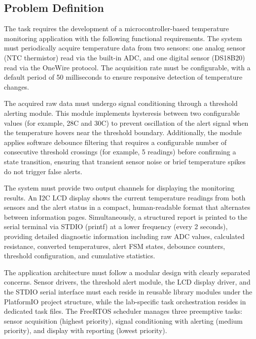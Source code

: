 \subsection{Problem Definition}

The task requires the development of a microcontroller-based temperature monitoring application with the following functional requirements. The system must periodically acquire temperature data from two sensors: one analog sensor (NTC thermistor) read via the built-in ADC, and one digital sensor (DS18B20) read via the OneWire protocol. The acquisition rate must be configurable, with a default period of 50 milliseconds to ensure responsive detection of temperature changes.

The acquired raw data must undergo signal conditioning through a threshold alerting module. This module implements hysteresis between two configurable values (for example, 28\textdegree C and 30\textdegree C) to prevent oscillation of the alert signal when the temperature hovers near the threshold boundary. Additionally, the module applies software debounce filtering that requires a configurable number of consecutive threshold crossings (for example, 5 readings) before confirming a state transition, ensuring that transient sensor noise or brief temperature spikes do not trigger false alerts.

The system must provide two output channels for displaying the monitoring results. An I2C LCD display shows the current temperature readings from both sensors and the alert status in a compact, human-readable format that alternates between information pages. Simultaneously, a structured report is printed to the serial terminal via STDIO (printf) at a lower frequency (every 2 seconds), providing detailed diagnostic information including raw ADC values, calculated resistance, converted temperatures, alert FSM states, debounce counters, threshold configuration, and cumulative statistics.

The application architecture must follow a modular design with clearly separated concerns. Sensor drivers, the threshold alert module, the LCD display driver, and the STDIO serial interface must each reside in reusable library modules under the PlatformIO project structure, while the lab-specific task orchestration resides in dedicated task files. The FreeRTOS scheduler manages three preemptive tasks: sensor acquisition (highest priority), signal conditioning with alerting (medium priority), and display with reporting (lowest priority).


